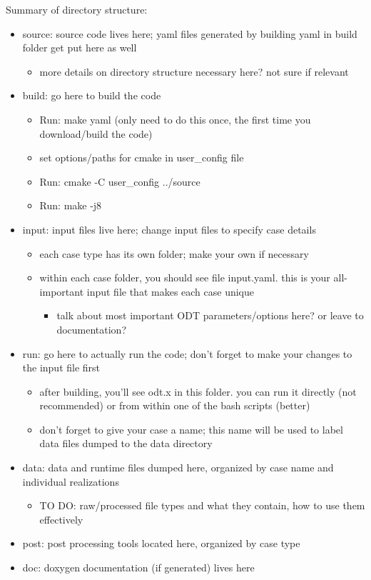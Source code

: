 \documentclass[preprint,12pt, a4paper]{elsarticle}
\begin{document}
Summary of directory structure:
\begin{itemize}
	\item source: source code lives here; yaml files generated by building yaml in build folder get put here as well
		\begin{itemize}
			\item more details on directory structure necessary here? not sure if relevant
		\end{itemize}
	\item build: go here to build the code
		\begin{itemize}
			\item Run: make yaml (only need to do this once, the first time you download/build the code)
			\item set options/paths for cmake in user\_config file
			\item Run: cmake -C user\_config ../source
			\item Run: make -j8
		\end{itemize}
	\item input: input files live here; change input files to specify case details
		\begin{itemize}
			\item each case type has its own folder; make your own if necessary
			\item within each case folder, you should see file input.yaml. this is your all-important input file that makes each case unique
			\begin{itemize}
				\item talk about most important ODT parameters/options here? or leave to documentation?
			\end{itemize}
		\end{itemize}
	\item run: go here to actually run the code; don't forget to make your changes to the input file first
		\begin{itemize}
			\item after building, you'll see odt.x in this folder. you can run it directly (not recommended) or from within one of the bash scripts (better)
			\item don't forget to give your case a name; this name will be used to label data files dumped to the data directory
		\end{itemize}
	\item data: data and runtime files dumped here, organized by case name and individual realizations
		\begin{itemize}
			\item TO DO: raw/processed file types and what they contain, how to use them effectively
		\end{itemize}
	\item post: post processing tools located here, organized by case type
	\item doc: doxygen documentation (if generated) lives here


\end{itemize}
\end{document}
